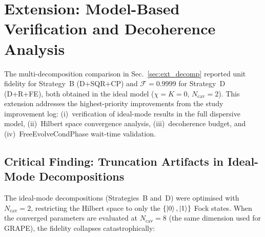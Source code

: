 \documentclass[aps,pra,twocolumn,reprint,floatfix,amsmath,amssymb]{revtex4-2}
\begin{document}
\section{Extension: Model-Based Verification and Decoherence Analysis}
\label{sec:ext_iter3}

The multi-decomposition comparison in Sec.~\ref{sec:ext_decomp}
reported unit fidelity for Strategy~B (D+SQR+CP) and
$\mathcal{F}=0.9999$ for Strategy~D (D+R+FE), both obtained in the
ideal model ($\chi=K=0$, $N_\mathrm{cav}=2$).  This extension
addresses the highest-priority improvements from the study
improvement log: (i)~verification of ideal-mode results in the full
dispersive model, (ii)~Hilbert space convergence analysis,
(iii)~decoherence budget, and (iv)~FreeEvolveCondPhase wait-time
validation.

\subsection{Critical Finding: Truncation Artifacts in Ideal-Mode
Decompositions}
\label{sec:truncation}

The ideal-mode decompositions (Strategies~B and~D) were optimised
with $N_\mathrm{cav}=2$, restricting the Hilbert space to only the
$\{\ket{0},\ket{1}\}$ Fock states.  When the converged parameters
are evaluated at $N_\mathrm{cav}=8$ (the same dimension used for
GRAPE), the fidelity collapses catastrophically:
\end{document}
